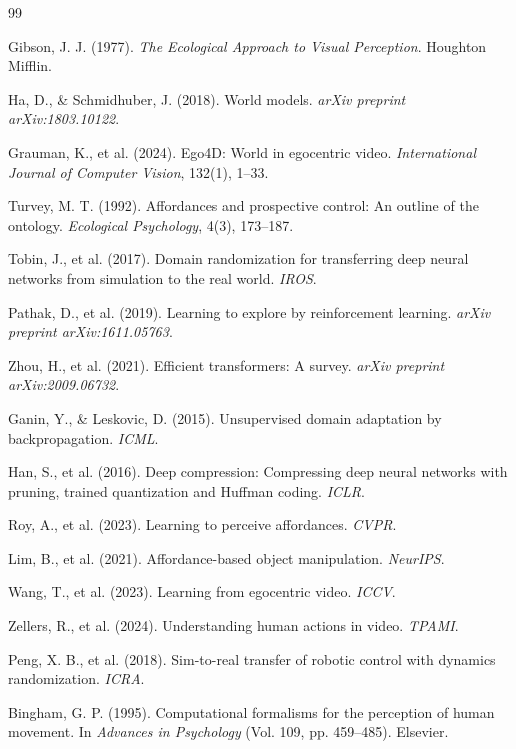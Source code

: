 \documentclass[11pt]{article}
\begin{document}
\begin{thebibliography}{99}

Gibson, J. J. (1977). \textit{The Ecological Approach to Visual Perception}. Houghton Mifflin.

Ha, D., \& Schmidhuber, J. (2018). World models. \textit{arXiv preprint arXiv:1803.10122}.

Grauman, K., et al. (2024). Ego4D: World in egocentric video. \textit{International Journal of Computer Vision}, 132(1), 1--33.

Turvey, M. T. (1992). Affordances and prospective control: An outline of the ontology. \textit{Ecological Psychology}, 4(3), 173--187.

Tobin, J., et al. (2017). Domain randomization for transferring deep neural networks from simulation to the real world. \textit{IROS}.

Pathak, D., et al. (2019). Learning to explore by reinforcement learning. \textit{arXiv preprint arXiv:1611.05763}.

Zhou, H., et al. (2021). Efficient transformers: A survey. \textit{arXiv preprint arXiv:2009.06732}.

Ganin, Y., \& Leskovic, D. (2015). Unsupervised domain adaptation by backpropagation. \textit{ICML}.

Han, S., et al. (2016). Deep compression: Compressing deep neural networks with pruning, trained quantization and Huffman coding. \textit{ICLR}.

Roy, A., et al. (2023). Learning to perceive affordances. \textit{CVPR}.

Lim, B., et al. (2021). Affordance-based object manipulation. \textit{NeurIPS}.

Wang, T., et al. (2023). Learning from egocentric video. \textit{ICCV}.

Zellers, R., et al. (2024). Understanding human actions in video. \textit{TPAMI}.

Peng, X. B., et al. (2018). Sim-to-real transfer of robotic control with dynamics randomization. \textit{ICRA}.

Bingham, G. P. (1995). Computational formalisms for the perception of human movement. In \textit{Advances in Psychology} (Vol. 109, pp. 459--485). Elsevier.

\end{thebibliography}
\end{document}
